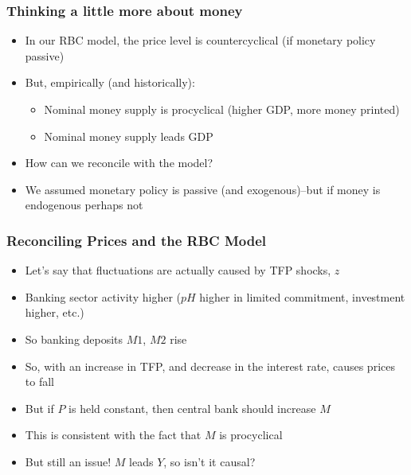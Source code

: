 \documentclass{beamer}
\begin{document}
\begin{frame}
\frametitle[alignment=center]{Thinking a little more about money}
\begin{itemize}
\item In our RBC model, the price level is countercyclical (if monetary policy passive)
\bigskip
\item But, empirically (and historically):
\begin{itemize}
\item Nominal money supply is procyclical (higher GDP, more money printed)
\bigskip
\item Nominal money supply leads GDP
\end{itemize}
\item How can we reconcile with the model?
\bigskip
\item We assumed monetary policy is passive (and exogenous)--but if money is endogenous perhaps not
\end{itemize}
\end{frame}

\begin{frame}
\frametitle[alignment=center]{Reconciling Prices and the RBC Model}
\begin{itemize}
\item Let's say that fluctuations are actually caused by TFP shocks, $z$
\bigskip
\item Banking sector activity higher ($pH$ higher in limited commitment, investment higher, etc.)
\bigskip
\item So banking deposits $M1$, $M2$ rise
\bigskip
\item So, with an increase in TFP, and decrease in the interest rate, causes prices to fall
\bigskip
\item But if $P$ is held constant, then central bank should increase $M$ 
\bigskip
\item This is consistent with the fact that $M$ is procyclical
\bigskip
\item But still an issue!  $M$ leads $Y$, so isn't it causal?
\end{itemize}
\end{frame}
\end{document}
